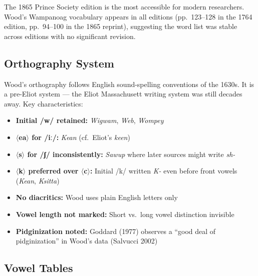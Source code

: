 The 1865 Prince Society edition is the most accessible for modern researchers.
Wood's Wampanoag vocabulary appears in all editions (pp.\ 123--128 in the 1764
edition, pp.\ 94--100 in the 1865 reprint), suggesting the word list was stable
across editions with no significant revision.

\subsection{Orthography System}

Wood's orthography follows English sound-spelling conventions of the 1630s.
It is a pre-Eliot system --- the Eliot Massachusett writing system was still
decades away. Key characteristics:

\begin{itemize}
  \item \textbf{Initial /w/ retained:} \emph{Wigwam}, \emph{Web}, \emph{Wompey}
  \item \textbf{$\langle$ea$\rangle$ for /iː/:} \emph{Kean} (cf.\ Eliot's
    \emph{keen})
  \item \textbf{$\langle$s$\rangle$ for /ʃ/ inconsistently:} \emph{Sawup} where
    later sources might write \emph{sh-}
  \item \textbf{$\langle$k$\rangle$ preferred over $\langle$c$\rangle$:}
    Initial /k/ written \emph{K-} even before front vowels (\emph{Kean},
    \emph{Ksitta})
  \item \textbf{No diacritics:} Wood uses plain English letters only
  \item \textbf{Vowel length not marked:} Short vs.\ long vowel distinction
    invisible
  \item \textbf{Pidginization noted:} Goddard (1977) observes a ``good deal of
    pidginization'' in Wood's data (Salvucci 2002)
\end{itemize}

\subsection{Vowel Tables}


